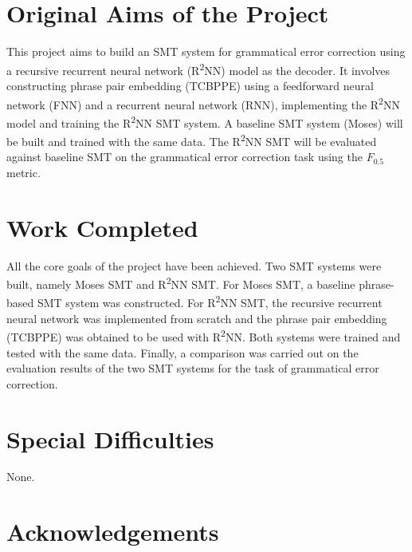 \documentclass[12pt,a4paper,twoside,openright]{report}
\begin{document}

\section*{Original Aims of the Project}
This project aims to build an SMT system for grammatical error correction using a recursive recurrent neural network (R\textsuperscript{2}NN) model as the decoder. It involves constructing phrase pair embedding (TCBPPE) using a feedforward neural network (FNN) and a recurrent neural network (RNN), implementing the R\textsuperscript{2}NN model and training the R\textsuperscript{2}NN SMT system. A baseline SMT system (Moses) will be built and trained with the same data. The R\textsuperscript{2}NN SMT will be evaluated against baseline SMT on the grammatical error correction task using the $F_{0.5}$ metric.

\section*{Work Completed}
All the core goals of the project have been achieved. Two SMT systems were built, namely Moses SMT and R\textsuperscript{2}NN SMT. For Moses SMT, a baseline phrase-based SMT system was constructed. For R\textsuperscript{2}NN SMT, the recursive recurrent neural network was implemented from scratch and the phrase pair embedding (TCBPPE) was obtained to be used with R\textsuperscript{2}NN. Both systems were trained and tested with the same data. Finally, a comparison was carried out on the evaluation results of the two SMT systems for the task of grammatical error correction.

\newpage

\section*{Special Difficulties}
None.

\section*{Acknowledgements}


\tableofcontents

\listoffigures


\end{document}
